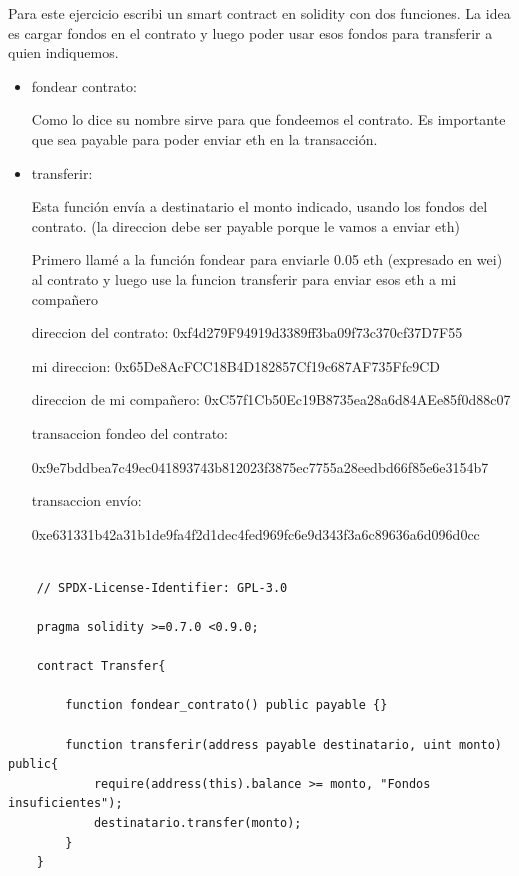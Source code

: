\documentclass[12pt,addpoints,answers]{exam}
\begin{document}
\begin{questions}
\begin{solution}
    Para este ejercicio escribi un smart contract en solidity con dos funciones. La idea es cargar fondos
    en el contrato y luego poder usar esos fondos para transferir a quien indiquemos.

    \begin{itemize}
        \item fondear contrato: 
        
        Como lo dice su nombre sirve para que fondeemos el contrato.
        Es importante que sea payable para poder enviar eth en la transacción.
        \item transferir: 
        
        Esta función envía a 
        destinatario el monto indicado, usando los fondos del contrato. (la direccion debe ser payable porque le
        vamos a enviar eth)


        Primero llamé a la función fondear para enviarle 0.05 eth (expresado en wei) al contrato y luego use
        la funcion transferir para enviar esos eth a mi compañero

        direccion del contrato: 0xf4d279F94919d3389ff3ba09f73c370cf37D7F55

        mi direccion: 0x65De8AcFCC18B4D182857Cf19c687AF735Ffc9CD
        
        direccion de mi compañero: 0xC57f1Cb50Ec19B8735ea28a6d84AEe85f0d88c07
        
        transaccion fondeo del contrato: 
        
        0x9e7bddbea7c49ec041893743b812023f3875ec7755a28eedbd66f85e6e3154b7
        
        transaccion envío: 

        0xe631331b42a31b1de9fa4f2d1dec4fed969fc6e9d343f3a6c89636a6d096d0cc 

    \end{itemize}
    
\end{solution}
\begin{verbatim}

    // SPDX-License-Identifier: GPL-3.0

    pragma solidity >=0.7.0 <0.9.0;

    contract Transfer{
        
        function fondear_contrato() public payable {} 

        function transferir(address payable destinatario, uint monto) public{
            require(address(this).balance >= monto, "Fondos insuficientes");
            destinatario.transfer(monto);
        }
    }


\end{verbatim}
\end{questions}
\end{document}
